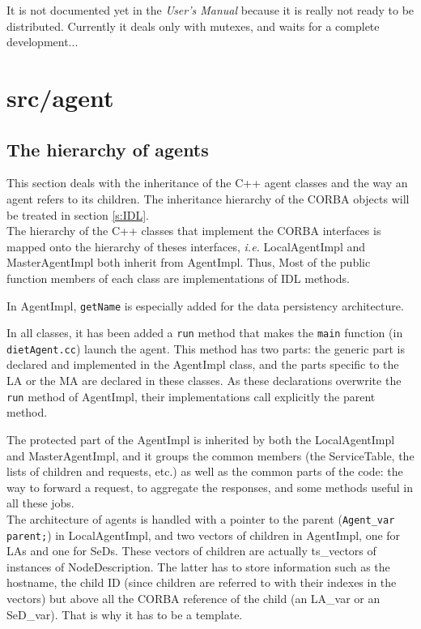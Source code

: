   It is not documented yet in the \textit{User's Manual} because it is really not
  ready to be distributed. Currently it deals only with mutexes, and waits for a
  complete development...



  \section{\textsf{src/agent}}
  \label{s:agent}

  \subsection{The hierarchy of agents}

  This section deals with the inheritance of the C++ agent classes and the way an
  agent refers to its children. The inheritance hierarchy of the CORBA objects
  will be treated in section \ref{s:IDL}.
  \\

  The hierarchy of the C++ classes that implement the CORBA interfaces is mapped
  onto the hierarchy of theses interfaces, \emph{i.e.} \textsf{LocalAgentImpl} and
  \textsf{MasterAgentImpl} both inherit from \textsf{AgentImpl}. Thus, Most of the
  public function members of each class are implementations of IDL methods.

  In \textsf{AgentImpl}, \texttt{getName} is especially added for the data
  persistency architecture.

  In all classes, it has been added a \texttt{run} method that makes the
  \texttt{main} function (in \texttt{dietAgent.cc}) launch the agent. This method
  has two parts: the generic part is declared and implemented in the
  \textsf{AgentImpl} class, and the parts specific to the LA or the MA are
  declared in these classes. As these declarations overwrite the \texttt{run}
  method of \textsf{AgentImpl}, their implementations call explicitly the parent
  method.

  The protected part of the \textsf{AgentImpl} is inherited by both the
  \textsf{LocalAgentImpl} and \textsf{MasterAgentImpl}, and it groups the common
  members (the \textsf{ServiceTable}, the lists of children and requests, etc.) as
  well as the common parts of the code: the way to forward a request, to aggregate
  the responses, and some methods useful in all these jobs.
  \\

  The architecture of agents is handled with a pointer to the parent
  (\verb+Agent_var parent;+) in \textsf{LocalAgentImpl}, and two vectors of children
  in \textsf{AgentImpl}, one for LAs and one for SeDs. These vectors of children are
  actually \textsf{ts\_vectors} of instances of \textsf{NodeDescription}. The
  latter has to store information such as the hostname, the child ID (since
      children are referred to with their indexes in the vectors) but above all the
  CORBA reference of the child (an \textsf{LA\_var} or an \textsf{SeD\_var}). That
  is why it has to be a template.



